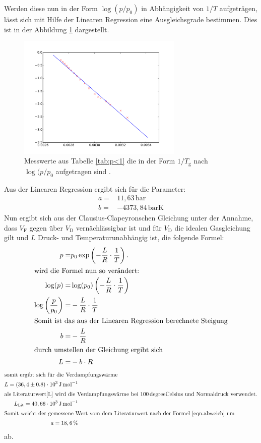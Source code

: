 Werden diese nun in der Form $\log(p/p_\mathrm{0})$ in Abhängigkeit von
$1/T$ aufgeträgen,
lässt sich mit Hilfe der Linearen Regression eine
Ausgleichsgrade bestimmen.
Dies ist in der Abbildung \ref{abb:plot1} dargestellt.
\begin{figure}
  \centering
  \includegraphics[width=0.7\textwidth]{plot1.pdf}
  \caption{Messwerte aus Tabelle \ref{tab:p<1} die in der Form $1/T_\mathrm{g}$ nach $\log(p/p_\mathrm{0}$ aufgetragen sind . }
  \label{abb:plot1}
\end{figure}
Aus der Linearen Regression ergibt sich für die Parameter:
\begin{align*}
  a=&   11,63\,\si{\bar}\\
  b=&  -4373,84\,\si{\bar\kelvin}
\end{align*}
Nun ergibt sich aus der Clausius-Clapeyronschen Gleichung
unter der Annahme, dass $V_\mathrm{F}$ gegen über
$V_\mathrm{D}$ vernächlässigbar ist und  für $V_\mathrm{D}$
die idealen Gasgleichung gilt und $L$ Druck- und
Temperaturunabhängig ist, die folgende Formel:
\begin{align}
  p=&p_\mathrm{0}\exp\left(-\frac{L}{R}\cdot\frac{1}{T}\right).\\
\intertext{wird die Formel nun so verändert:}
\log(p)=& \log(p_\mathrm{0})\left(-\frac{L}{R}\cdot\frac{1}{T}\right)\\
\log\left(\frac{p}{p_\mathrm{0}}\right)=&-\frac{L}{R}\cdot\frac{1}{T}\\
\intertext{Somit ist das aus der Linearen Regression berechnete Steigung}
b=&-\frac{L}{R}\\
\intertext{durch umstellen der Gleichung ergibt sich}
L=&-b\cdot R\\
\end{align}
\begin{align*}
\intertext{somit ergibt sich für die Verdampfungswärme }
L=(36,4\pm0.8)\cdot 10^3 \,\si{\joule\per\mol}\\
\intertext{als Literaturwert\cite{L} wird die Verdampfungswärme bei $100\,\si{degreeCelsius}$ und Normaldruck verwendet.}
L_\mathrm{Lit}= 40,66\cdot 10^3 \,\si{\joule\per\mol}\\
\intertext{Somit weicht der gemessene Wert vom dem Literaturwert nach der Formel \eqref{eqn:abweich} um}
a=18,6 \,\si{\percent}
\end{align*}
ab.
